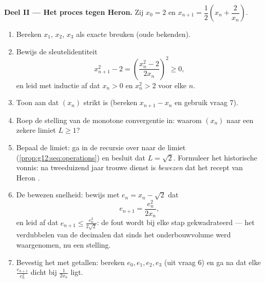 \begin{problem}
\medskip
\noindent\textbf{Deel II --- Het proces tegen Heron.}
Zij $x_0 = 2$ en $x_{n+1} = \dfrac12\left(x_n + \dfrac{2}{x_n}\right)$.
\begin{enumerate}[resume]
  \item Bereken $x_1$, $x_2$, $x_3$ als exacte breuken (oude bekenden).
  \item Bewijs de sleutelidentiteit
        \[
        x_{n+1}^2 - 2 = \left(\frac{x_n^2 - 2}{2x_n}\right)^{\!2}
        \geq 0,
        \]
        en leid met inductie af dat $x_n > 0$ en $x_n^2 > 2$ voor elke $n$.
  \item Toon aan dat $(x_n)$ strikt  is (bereken $x_{n+1} - x_n$ en
        gebruik vraag 7).
  \item Roep de stelling van de monotone convergentie in: waarom 
        $(x_n)$ naar een zekere limiet $L \geq 1$?
  \item Bepaal de limiet: ga in de recursie over naar de limiet
        (\cref{prop:g12:seq:operations}) en besluit dat $L = \sqrt2$.
        Formuleer het historische vonnis: na tweeduizend jaar trouwe dienst is
        \emph{bewezen} dat het recept van Heron .
  \item De bewezen snelheid: bewijs met $e_n = x_n - \sqrt2$ dat
        \[
        e_{n+1} = \frac{e_n^2}{2 x_n} ,
        \]
        en leid af dat $e_{n+1} \leq \frac{e_n^2}{2\sqrt2}$: de fout wordt bij
        elke stap gekwadrateerd --- het verdubbelen van de decimalen dat sinds
        het onderbouwvolume werd waargenomen, nu een stelling.
  \item Bevestig het met getallen: bereken $e_0, e_1, e_2, e_3$ (uit vraag 6)
        en ga na dat elke $\frac{e_{n+1}}{e_n^2}$ dicht bij $\frac{1}{2x_n}$
        ligt.
\end{enumerate}


\end{problem}
